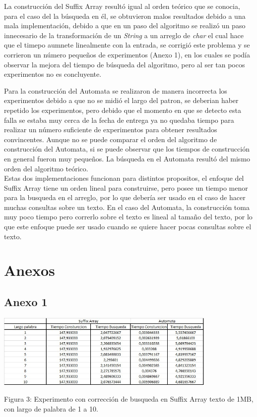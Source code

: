 \documentclass[letterpaper,10pt]{article}
\begin{document}
	La construcción del Suffix Array resultó igual al orden teórico que se conocia, para el caso del la búsqueda en él, se obtuvieron malos resultados debido a una mala implementación, debido a que en un paso del algoritmo se realizó un paso innecesario de la transformación de un \textit{String} a un arreglo de \textit{char} el cual hace que el timepo aumnete linealmente con la entrada, se corrigió este problema y se corrieron un número pequeños de experimentos (Anexo 1), en los cuales se podía observar la mejora del tiempo de búsqueda del algoritmo, pero al ser tan pocos experimentos no es concluyente.
	
	Para la construcción del Automata se realizaron de manera incorrecta los experimentos debido a que no se midió el largo del patron, se deberian haber repetido los experimentos, pero debido que el momento en que se detecto esta falla se estaba muy cerca de la fecha de entrega ya no quedaba tiempo para realizar un número suficiente de experimentos para obtener resultados convincentes. Aunque no se puede comparar el orden del algoritmo de construcción del Automata, si se puede observar que los tiempos de construcción en general fueron muy pequeños. La búsqueda en el Automata resultó del mismo orden del algoritmo teórico.\\
	
	Estas dos implementaciones funcionan para distintos propositos, el enfoque del Suffix Array tiene un orden lineal para construirse, pero posee un tiempo menor para la busqueda en el arreglo, por lo que debería ser usado en el caso de hacer muchas consultas sobre un texto. En el caso del Automata, la construcción toma muy poco tiempo pero correrlo sobre el texto es lineal al tamaño del texto, por lo que este enfoque puede ser usado cuando se quiere hacer pocas consultas sobre el texto.
	
	\newpage
	
	\section{Anexos}
        \subsection{Anexo 1}
        
		\includegraphics[width=0.8\textwidth]{figura3.jpg}

		Figura 3: Experimento con corrección de busqueda en Suffix Array texto de 1MB, con largo de palabra de 1 a 10.
       
	
	
	
	
\end{document}
